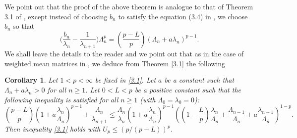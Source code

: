 \documentclass[11pt]{amsart}
\newtheorem{cor}{Corollary}[section]
\numberwithin{equation}{section}
\theoremstyle{definition}
\theoremstyle{remark}
\begin{document}
   We point out that the proof of the above theorem is analogue to
   that of Theorem 3.1 of \cite{G7}, except instead of choosing
   $b_n$ to satisfy the equation (3.4) in \cite{G7}, we choose
   $b_n$ so that
\begin{equation*}
     \Big( \frac {b_n}{\lambda_n}-\frac {1}{\lambda_{n+1}} \Big )
    \Lambda^p_n=(\frac {p-L}{p})(\Lambda_n+a\lambda_n)^{p-1}.
\end{equation*}
   We shall leave the details to the reader and we point out that
   as in the case of weighted mean matrices in \cite{G7}, we
   deduce from Theorem \ref{3.1} the following
\begin{cor}
\label{cor1}
   Let $1<p<\infty$ be fixed in \eqref{3.1}. Let $a$ be a constant such that $\Lambda_n+a\lambda_n>0$ for all $n \geq 1$.
  Let $0<L<p$ be a positive constant such that the following
  inequality is satisfied for all $n \geq 1$ (with $\Lambda_0=\lambda_0=0$):
\begin{equation*}
  ( \frac {p-L}{p} )(1+a\frac
  {\lambda_n}{\Lambda_n})^{p-1}+\frac
  {\Lambda_n}{\lambda_{n+1}} \leq \frac
  {\Lambda_n}{\lambda_{n}}(1+a\frac
  {\lambda_n}{\Lambda_n})^{p-1}((1-\frac {L}{p})\frac {\lambda_n}{\Lambda_n}+\frac {\Lambda_{n-1}}{\Lambda_n}+a\frac {\lambda_{n-1}}{\Lambda_n})^{1-p}.
\end{equation*}
   Then inequality \eqref{3.1} holds with
    $U_{p} \leq (p/(p-L))^p$.
\end{cor}
\end{document}
